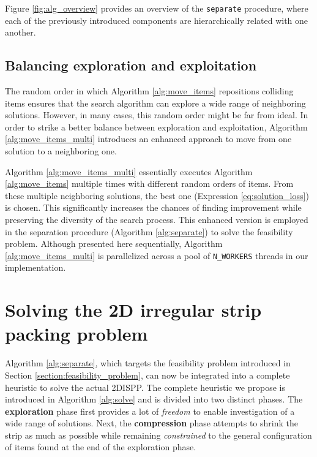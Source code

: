 \documentclass[preprint, 11pt, authoryear]{elsarticle}
\begin{document}
Figure \ref{fig:alg_overview} provides an overview of the \texttt{separate} procedure, where each of the previously introduced components are hierarchically related with one another.

\subsection{Balancing exploration and exploitation}\label{section:move_items_multi}

The random order in which Algorithm \ref{alg:move_items} repositions colliding items ensures that the search algorithm can explore a wide range of neighboring solutions.
However, in many cases, this random order might be far from ideal.
In order to strike a better balance between exploration and exploitation, Algorithm \ref{alg:move_items_multi} introduces an enhanced approach to move from one solution to a neighboring one.



Algorithm \ref{alg:move_items_multi} essentially executes Algorithm \ref{alg:move_items} multiple times with different random orders of items.
From these multiple neighboring solutions, the best one (Expression \ref{eq:solution_loss}) is chosen.
This significantly increases the chances of finding improvement while preserving the diversity of the search process.
This enhanced version is employed in the separation procedure (Algorithm \ref{alg:separate}) to solve the feasibility problem.
Although presented here sequentially, Algorithm \ref{alg:move_items_multi} is parallelized across a pool of \texttt{N\_WORKERS} threads in our implementation.

\section{Solving the 2D irregular strip packing problem} \label{section:spp_heuristic}
Algorithm \ref{alg:separate}, which targets the feasibility problem introduced in Section \ref{section:feasibility_problem}, can now be integrated into a complete heuristic to solve the actual 2DISPP.
The complete heuristic we propose is introduced in Algorithm \ref{alg:solve} and is divided into two distinct phases.
The \textbf{exploration} phase first provides a lot of \emph{freedom} to enable investigation of a wide range of solutions.
Next, the \textbf{compression} phase attempts to shrink the strip as much as possible while remaining \emph{constrained} to the general configuration of items found at the end of the exploration phase.
\end{document}
